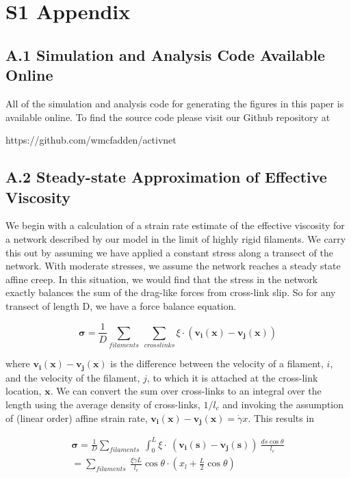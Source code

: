 \documentclass[10pt,letterpaper]{article}
\date{}
\begin{document}
\vspace*{0.2in}

\section*{S1 Appendix}
\subsection*{A.1 Simulation and Analysis Code Available Online}
All of the simulation and analysis code for generating the figures in this paper is available online.  To find the source code please visit our Github repository at 

https://github.com/wmcfadden/activnet

\subsection*{A.2 Steady-state Approximation of Effective Viscosity}
\label{sec:eff_vic}
We begin with a calculation of a strain rate estimate of the effective viscosity for a network described by our model in the limit of highly rigid filaments.  We carry this out by assuming we have applied a constant stress along a transect of the network.  With moderate stresses, we assume the network reaches a steady state affine creep. In this situation, we would find that the stress in the network exactly balances the sum of the drag-like forces from cross-link slip.  So for any transect of length D, we have a force balance equation.

\begin{equation}
\mathbf{\sigma} = \frac{1}{D}\sum_{filaments}\: \sum_{crosslinks}\xi \cdot (\mathbf{v_i(x)}-\mathbf{v_j(x)})
\end{equation}

where $\mathbf{v_i(x)}-\mathbf{v_j(x)}$ is the difference between the velocity of a filament, $i$, and the velocity of the filament, $j$, to which it is attached at the cross-link location, $\mathbf{x}$. We can convert the sum over cross-links to an integral over the length using the average density of cross-links, $1/l_c$ and invoking the assumption of (linear order) affine strain rate, $\mathbf{v_i(x)}-\mathbf{v_j(x)}=\dot \gamma x$. This results in

\begin{multline}
\mathbf{\sigma} =  \frac{1}{D}\sum_{filaments}\:  \int_0^L \xi \cdot  \: (\mathbf{v_i(s)}-\mathbf{v_j(s)}) \:\frac{ds \cos \theta }{l_c} \\
 = \sum_{filaments}\:  \frac{\xi \dot \gamma L}{l_c} \cos \theta \cdot (x_l + \frac{L}{2} \cos \theta)
\end{multline}
\end{document}
